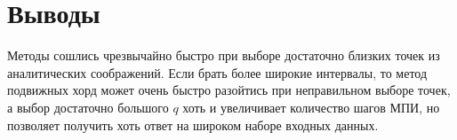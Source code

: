 \documentclass[11pt,a4paper,oneside]{article}
\begin{document}
\section{Выводы}

Методы сошлись чрезвычайно быстро при выборе достаточно близких точек из аналитических соображений. Если брать более широкие интервалы, то метод подвижных хорд может очень быстро разойтись при неправильном выборе точек, а выбор достаточно большого $q$ хоть и увеличивает количество шагов МПИ, но позволяет получить хоть ответ на широком наборе входных данных.
\end{document}
